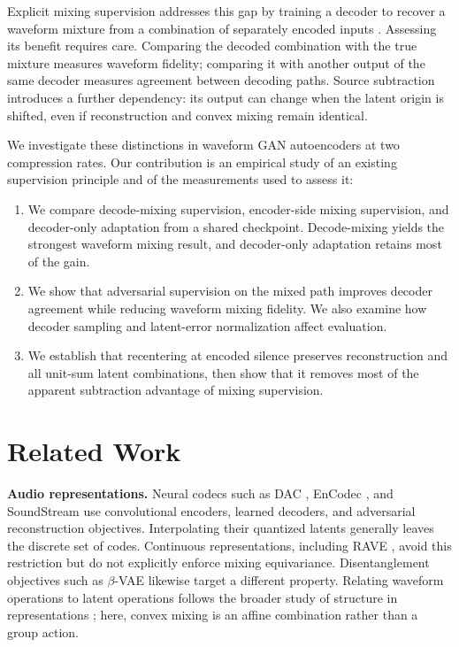 \documentclass[conference]{IEEEtran}
\begin{document}
Explicit mixing supervision addresses this gap by training a decoder to
recover a waveform mixture from a combination of separately encoded inputs
\cite{torres2026linearity}. Assessing its benefit requires care. Comparing
the decoded combination with the true mixture measures waveform fidelity;
comparing it with another output of the same decoder measures agreement
between decoding paths. Source subtraction introduces a further dependency:
its output can change when the latent origin is shifted, even if
reconstruction and convex mixing remain identical.

We investigate these distinctions in waveform GAN autoencoders at two
compression rates. Our contribution is an empirical study of an existing
supervision principle and of the measurements used to assess it:
\begin{enumerate}
  \item We compare decode-mixing supervision, encoder-side mixing
  supervision, and decoder-only adaptation from a shared checkpoint.
  Decode-mixing yields the strongest waveform mixing result, and
  decoder-only adaptation retains most of the gain.
  \item We show that adversarial supervision on the mixed path improves
  decoder agreement while reducing waveform mixing fidelity. We also
  examine how decoder sampling and latent-error normalization affect
  evaluation.
  \item We establish that recentering at encoded silence preserves
  reconstruction and all unit-sum latent combinations, then show that it
  removes most of the apparent subtraction advantage of mixing supervision.
\end{enumerate}
\section{Related Work}\label{sec:related}
\textbf{Audio representations.} Neural codecs such as DAC
\cite{kumar2024dac}, EnCodec \cite{defossez2023encodec}, and SoundStream
\cite{zeghidour2022soundstream} use convolutional encoders, learned decoders,
and adversarial reconstruction objectives. Interpolating their quantized
latents generally leaves the discrete set of codes.
Continuous representations, including RAVE \cite{caillon2021rave},
avoid this restriction but do not explicitly enforce mixing equivariance.
Disentanglement objectives such as $\beta$-VAE \cite{higgins2017betavae}
likewise target a different property. Relating waveform operations to latent
operations follows the broader study of structure in representations
\cite{higgins2018towards}; here, convex mixing is an affine combination
rather than a group action.
\end{document}
